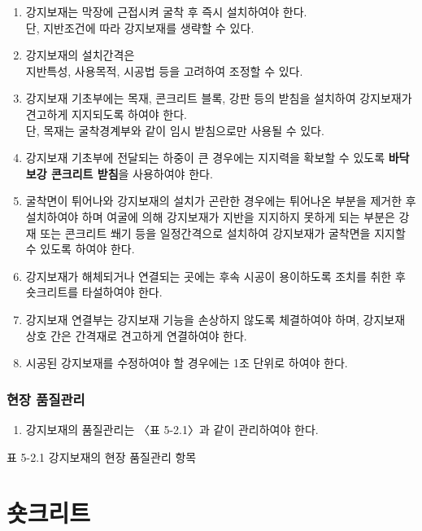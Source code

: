 \begin{enumerate}
\item 강지보재는 막장에 근접시켜 굴착 후 즉시 설치하여야 한다. \\ 단, 지반조건에 따라 강지보재를 생략할 수 있다.  
\item 강지보재의 설치간격은 \\ 지반특성, 사용목적, 시공법 등을 고려하여 조정할 수 있다.  
\item 강지보재 기초부에는 목재, 콘크리트 블록, 강판 등의 받침을 설치하여 강지보재가 견고하게 지지되도록 하여야 한다. 
      \\ 단, 목재는 굴착경계부와 같이 임시 받침으로만 사용될 수 있다.  
\item 강지보재 기초부에 전달되는 하중이 큰 경우에는 지지력을 확보할 수 있도록 \textbf {바닥보강 콘크리트 받침}을 사용하여야 한다.  
\item 굴착면이 튀어나와 강지보재의 설치가 곤란한 경우에는 튀어나온 부분을 제거한 후 설치하여야 하며 
      여굴에 의해 강지보재가 지반을 지지하지 못하게 되는 부분은 강재 또는 콘크리트 쐐기 등을 일정간격으로 설치하여 
      강지보재가 굴착면을 지지할 수 있도록 하여야 한다.  
\item 강지보재가 해체되거나 연결되는 곳에는 후속 시공이 용이하도록 조치를 취한 후 숏크리트를 타설하여야 한다.  
\item 강지보재 연결부는 강지보재 기능을 손상하지 않도록 체결하여야 하며, 강지보재 상호 간은 간격재로 견고하게 연결하여야 한다.  
\item 시공된 강지보재를 수정하여야 할 경우에는 1조 단위로 하여야 한다.  
\end{enumerate}


\subsubsection{현장 품질관리}

\begin{enumerate}
\item 강지보재의 품질관리는 〈표 5-2.1〉과 같이 관리하여야 한다.  
\end{enumerate}
   
   
표 5-2.1 강지보재의 현장 품질관리 항목

%
%
%


\newpage
\section[숏크리트]{숏크리트}


